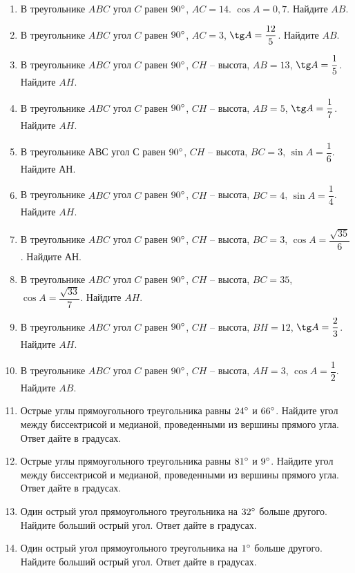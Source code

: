 \documentclass[12pt, a4paper]{article}
\begin{document}
\begin{enumerate}
		\item В треугольнике \( ABC \) угол \( C \) равен \( 90 \degree \), \( AC=14 \).  \( \cos A=0,7 \). Найдите \( AB \).
		\item В треугольнике \( ABC \) угол \( C \) равен \( 90\degree \), \( AC=3 \),  \( \tg A=\dfrac{12}{5} \). Найдите \( AB \).
		\item В треугольнике \( ABC \) угол \( C \) равен \( 90\degree \), \( CH \) – высота, \( AB=13 \),  \( \tg A=\dfrac{1}{5} \). Найдите \( AH \).
		\item В треугольнике \( ABC \) угол \( C \) равен \( 90 \degree \), \( CH \) – высота, \( AB=5 \),  \( \tg A=\dfrac{1}{7} \). Найдите \( AH \).
		\item В треугольнике \( АВС \) угол \( С \) равен \( 90 \degree \), \( CH \) – высота, \( BC=3 \),  \( \sin A=\dfrac{1}{6} \). Найдите \( АН \).
		\item В треугольнике \( ABC \) угол \( C \) равен \( 90 \degree \), \( CH \) – высота, \( BC=4 \),  \( \sin A = \dfrac{1}{4} \). Найдите \( AH \).
		\item В треугольнике \( ABC \) угол \( C \) равен \( 90 \degree \), \( CH \) – высота, \( BC=3 \),  \( \cos A =\dfrac{\sqrt{35}}{6} \). Найдите \( АН \).
		\item В треугольнике \( ABC \) угол \( C \) равен \( 90 \degree \), \( CH \) – высота, \( BC=35 \),  \( \cos A =\dfrac{\sqrt{33}}{7} \). Найдите \( AH \).
		\item В треугольнике \( ABC \) угол \( C \) равен \( 90\degree \), \( CH  \) – высота, \( BH = 12 \),  \( \tg A = \dfrac{2}{3} \). Найдите \( AH \).
		\item В треугольнике \( ABC \) угол \( C \) равен \( 90\degree \), \( CH  \) – высота, \(AH=3\),  \( \cos A = \dfrac{1}{2}\). Найдите \( AB \).
		\item Острые углы прямоугольного треугольника равны \( 24 \degree \) и \( 66 \degree \). Найдите угол между биссектрисой и медианой, проведенными из вершины прямого угла. Ответ дайте в градусах.
		\item Острые углы прямоугольного треугольника равны \( 81\degree \) и \( 9\degree \). Найдите угол между биссектрисой и медианой, проведенными из вершины прямого угла. Ответ дайте в градусах.
		\item Один острый угол прямоугольного треугольника на \( 32\degree \) больше другого. Найдите больший острый угол. Ответ дайте в градусах.
		\item Один острый угол прямоугольного треугольника на \( 1\degree \) больше другого. Найдите больший острый угол. Ответ дайте в градусах.

\end{enumerate}
\end{document}
